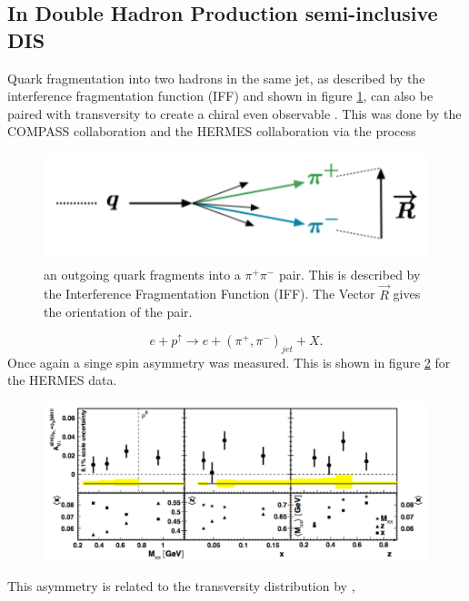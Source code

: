 \documentclass[abstract = on,listof=totoc, bibliography=totoc]{scrreprt}
\begin{document}
\subsection{In Double Hadron Production semi-inclusive DIS}
\label{subSec:doublehadProd}
Quark fragmentation into two hadrons in the same jet, as described by the interference fragmentation function (IFF) and shown in figure \ref{fig:IFF}, can also be paired with transversity to create a chiral even observable \cite{EFREMOV1992394, Bianconi:1999cd}. This was done by the COMPASS collaboration \cite{compassRes} and the HERMES collaboration \cite{hermesRes} via the process
\begin{figure}
\begin{center}
\includegraphics[width = .7\textwidth]{IFFwrite}
\caption[Interference Fragmentation Function]{an outgoing quark fragments into a $\pi^+\pi^-$ pair. This is described by the Interference Fragmentation Function (IFF). The Vector $\vec{R}$ gives the orientation of the pair.}
\label{fig:IFF}
\end{center}
\end{figure}
 \begin{equation}
e+p^\uparrow \rightarrow e + (\pi^+,\pi^-)_{jet} + X.
\end{equation}
Once again a singe spin asymmetry was measured. This is shown in figure \ref{fig:hermesAsym} for the HERMES data.
 \begin{figure}
\begin{center}
\includegraphics[width = 1\textwidth]{hermesAsym}
\caption[]{}
\label{fig:hermesAsym}
\end{center}
\end{figure}
This asymmetry is related to the transversity distribution by \cite{hermesRes},
\end{document}
